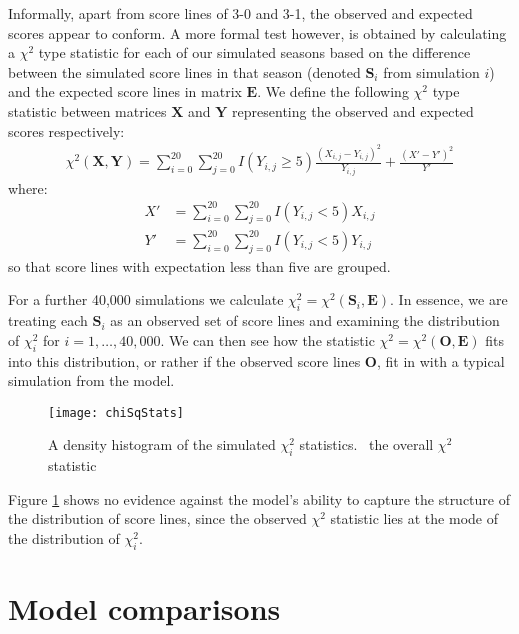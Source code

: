 Informally, apart from score lines of 3-0 and 3-1, the observed and expected scores appear to conform. A more formal
test however, is obtained by calculating a \(\chi^2\) type statistic for each of our simulated seasons based on the
difference between the simulated score lines in that season (denoted \(\boldsymbol{S}_i\) from simulation \(i\)) and the
expected score lines in matrix \(\boldsymbol{E}\). We define the following \(\chi^2\) type statistic between matrices
\(\boldsymbol{X}\) and \(\boldsymbol{Y}\) representing the observed and expected scores respectively:
\begin{align}
\chi^2(\boldsymbol{X}, \boldsymbol{Y}) = \sum_{i=0}^{20} \sum_{j=0}^{20} I(Y_{i, j} \geq 5)
\frac{(X_{i, j} - Y_{i, j})^2}{Y_{i, j}} + \frac{(X' - Y')^2}{Y'}
\end{align}
where:
\begin{align}
X' &= \sum_{i=0}^{20} \sum_{j=0}^{20} I(Y_{i, j} < 5) X_{i, j} \\
Y' &= \sum_{i=0}^{20} \sum_{j=0}^{20} I(Y_{i, j} < 5) Y_{i, j}
\end{align}
so that score lines with expectation less than five are grouped.

For a further 40,000 simulations we calculate \(\chi^2_i = \chi^2(\boldsymbol{S}_i, \boldsymbol{E})\).
In essence, we are treating each \(\boldsymbol{S}_i\) as an observed set of score lines and examining the distribution
of \(\chi^2_i\) for \(i = 1, \ldots, 40,000\). We can then see how the statistic \(\chi^2 = \chi^2(\boldsymbol{O},
\boldsymbol{E})\) fits into this distribution, or rather if the observed score lines \(\boldsymbol{O}\), fit in with a
typical simulation from the model.
\begin{figure}[htp]
\begin{center}
\texttt{[image: chiSqStats]}
\caption{A density histogram of the simulated \(\chi^2_i\) statistics. \protect\redSolidLine\ the overall \(\chi^2\)
statistic}
\label{chiSqStats}
\end{center}
\end{figure}
Figure \ref{chiSqStats} shows no evidence against the model's ability to capture the structure of the distribution of
score lines, since the observed \(\chi^2\) statistic lies at the mode of the distribution of \(\chi^2_i\).

\section{Model comparisons} 
\label{sec:Model_comparisons}

